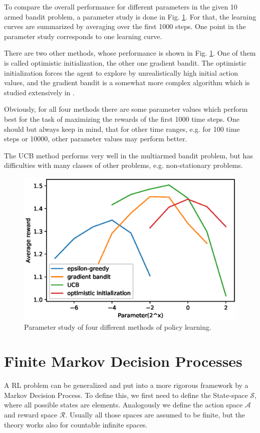 \documentclass[paper=a4, fontsize=11pt]{scrartcl} %
\numberwithin{equation}{section} %
\numberwithin{figure}{section} %
\numberwithin{table}{section} %
\begin{document}
	To compare the overall performance for different parameters in the given 10 armed bandit problem, a parameter study is done in Fig. \ref{fig:comparison}. For that, the learning curves are summarized by averaging over the first 1000 steps. One point in the parameter study corresponds to one learning curve.

	There are two other methods, whose performance is shown in Fig. \ref{fig:comparison}. One of them is called optimistic initialization, the other one gradient bandit. The optimistic initialization forces the agent to explore by unrealistically high initial action values, and the gradient bandit is a somewhat more complex algorithm which is studied extensively in \cite{SuttonBarto}.

	Obviously, for all four methods there are some parameter values which perform best for the task of maximizing the rewards of the first 1000 time steps. One should but always keep in mind, that for other time ranges, e.g. for 100 time steps or 10000, other parameter values may perform better. 

	The UCB method performs very well in the multiarmed bandit problem, but has difficulties with many classes of other problems, e.g. non-stationary problems. 

\begin{figure}[H]
\centering
\includegraphics[width=0.6\linewidth]{Images/figure_2_6.eps}
\caption{\cite{ShangtongZhang} Parameter study of four different methods of policy learning.}
\label{fig:comparison}
\end{figure}


\section{Finite Markov Decision Processes}

	A RL problem can be generalized and put into a more rigorous framework by a Markov Decision Process. To define this, we first need to define the State-space $\mathcal{S} $, where all possible states are elements. Analogously we define the action space $\mathcal{A}$ and reward space $\mathcal{R}$. Usually all those spaces are assumed to be finite, but the theory works also for countable infinite spaces.
\end{document}

